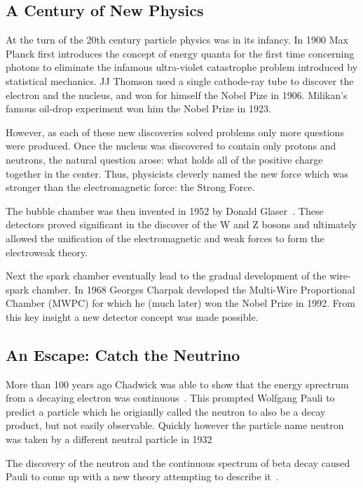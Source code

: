 \subsection{A Century of New Physics}

At the turn of the 20th century particle physics was in its infancy.
In 1900 Max Planck first introduces the concept of energy quanta for the first time concerning photons to eliminate the infamous ultra-violet catastrophe problem introduced by statistical mechanics.
JJ Thomson used a single cathode-ray tube to discover the electron and the nucleus, and won for himself the Nobel Pize in 1906.
Milikan's famous oil-drop experiment won him the Nobel Prize in 1923.

However, as each of these new discoveries solved problems only more questions were produced.
Once the nucleus was discovered to contain only protons and neutrons, the natural question arose: what holds all of the positive charge together in the center.
Thus, physicists cleverly named the new force which was stronger than the electromagnetic force: the Strong Force.

The bubble chamber was then invented in 1952 by Donald Glaser~\citep{bubbleChamber_PhysRev.87.665}.
These detectors proved significant in the discover of the W and Z bosons and ultimately allowed the unification of the electromagnetic and weak forces to form the electroweak theory.

Next the spark chamber eventually lead to the gradual development of the wire-spark chamber.
In 1968 Georges Charpak developed the Multi-Wire Proportional Chamber (MWPC) for which he (much later) won the Nobel Prize in 1992.
From this key insight a new detector concept was made possible.


\subsection{An Escape: Catch the Neutrino}

More than 100 years ago Chadwick was able to show that the energy sprectrum from a decaying electron was continuous~\citep{Chadwick:1914zz}.
This prompted Wolfgang Pauli to predict a particle which he origianlly called the neutron to also be a decay product, but not easily observable.
Quickly however the particle name neutron was taken by a different neutral particle in 1932~\citep{Chadwick1932PossibleEO}

The discovery of the neutron and the continuous spectrum of beta decay caused Pauli to come up with a new theory attempting to describe it~\citep{pauli_1934}.

